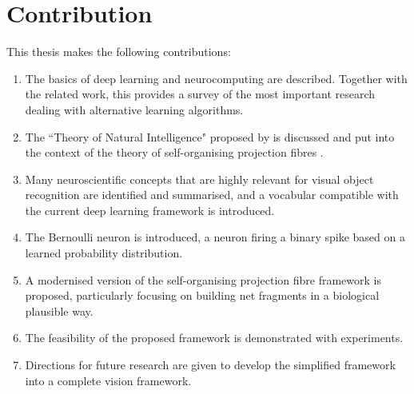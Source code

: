 \section{Contribution}
This thesis makes the following contributions:
\begin{enumerate}
	\item The basics of deep learning and neurocomputing are described. Together with the related work, this provides a survey of the most important research dealing with alternative learning algorithms.
	\item The ``Theory of Natural Intelligence" proposed by  is discussed and put into the context of the theory of self-organising projection fibres .
    \item Many neuroscientific concepts that are highly relevant for visual object recognition are identified and summarised, and a vocabular compatible with the current deep learning framework is introduced.
	\item The Bernoulli neuron is introduced, a neuron firing a binary spike based on a learned probability distribution.
	\item A modernised version of the self-organising projection fibre framework is proposed, particularly focusing on building net fragments in a biological plausible way.
    \item The feasibility of the proposed framework is demonstrated with experiments.
    \item Directions for future research are given to develop the simplified framework into a complete vision framework.
\end{enumerate}


